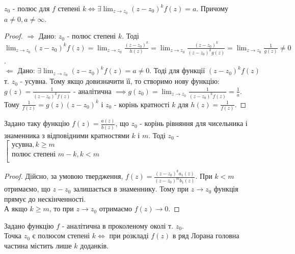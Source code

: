\documentclass{math_library}
\begin{document}
\begin{lemma}
$z_0$ - полюс для $f$ степені $k \iff \exists \displaystyle \lim_{z \to z_0} (z-z_0)^k f(z) = a$. Причому $a \neq 0, a \ne \infty$.
\end{lemma}

\begin{proof}
$\boxed{\Rightarrow} $ Дано: $z_0$ - полюс степені $k$. Тоді \\
$\displaystyle \lim_{z \to z_0} (z-z_0)^k f(z) = \lim_{z \to z_0} \frac{(z-z_0)^k}{h(z)} = \lim_{z \to z_0} \frac{(z-z_0)^k}{(z-z_0)^k g(z)} = \lim_{z \to z_0} \frac{1}{g(z)} \neq 0$.
	 \bigskip \\
 $\boxed{\Leftarrow} $ Дано: $\exists \displaystyle \lim_{z \to z_0} (z-z_0)^k f(z) = a \neq 0$. Тоді для функції $(z-z_0)^k f(z)$ т. $z_0$ - усувна. Тому якщо довизначити її, то створимо нову функцію:\\
	 $\displaystyle g(z) = \frac{1}{(z-z_0)^k f(z)}$ - аналітична  $\displaystyle \implies g(z_0)=\lim_{z \to z_0} \frac{1}{(z-z_0)^k f(z)} = \frac{1}{a}$.\\
	 Тому  $\displaystyle\frac{1}{f(z)}=g(z)(z-z_0)^k$ і $z_0$ - корінь кратності $k$ для $h(z)=\displaystyle \frac{1}{f(z)}$.
\end{proof}

\begin{proposition}
Задано таку функцію $\displaystyle f(z)=\frac{a(z)}{b(z)}$, що $z_0$ - корінь рівняння для чисельника і знаменника з відповідними кратностями $k$ і $m$. Тоді $z_0$ - $\left[
  \begin{array}{ccc}
     \textrm{усувна}, k \geq m \\
     \textrm{полюс степені  } m-k, k < m \\
  \end{array}
\right.$
\end{proposition}

\begin{proof}
Дійсно, за умовою твердження, $\displaystyle f(z)=\frac{(z-z_0)^k a_1(z)}{(z-z_0)^m b_1(z)}$. При $k<m$ отримаємо, що $z-z_0$ залишається в знаменнику. Тому при $z\to z_0$ функція прямує до нескінченності.\\
А якщо $k \geq m$, то при $z \to z_0$ отримаємо $f(z) \to 0$.
\end{proof}

\begin{theorem}
Задано функцію $f$ - аналітична в проколеному околі т. $z_0$.\\
Точка $z_0$ є полюсом степені $k \iff$ при розкладі $f(z)$ в ряд Лорана головна частина містить лише $k$ доданків.
\end{theorem}
\end{document}
